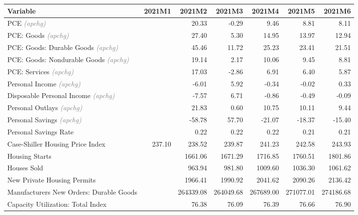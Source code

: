 \documentclass[11pt, letterpaper]{article}\usepackage[]{graphicx}\usepackage[]{color}
\begin{document}
\begin{table}[H]
\centering
\begingroup\fontsize{10pt}{12pt}\selectfont
\begin{tabular}{lrrrrrr}
  \hline
Variable & 2021M1 & 2021M2 & 2021M3 & 2021M4 & 2021M5 & 2021M6 \\ 
  \hline
PCE \textit{\footnotesize\textcolor{gray}{(apchg)}} &  & 20.33 & -0.29 & 9.46 & 8.81 & 8.11 \\ 
  PCE: Goods \textit{\footnotesize\textcolor{gray}{(apchg)}} &  & 27.40 & 5.30 & 14.95 & 13.97 & 12.94 \\ 
  PCE: Goods: Durable Goods \textit{\footnotesize\textcolor{gray}{(apchg)}} &  & 45.46 & 11.72 & 25.23 & 23.41 & 21.51 \\ 
  PCE: Goods: Nondurable Goods \textit{\footnotesize\textcolor{gray}{(apchg)}} &  & 19.14 & 2.17 & 10.06 & 9.45 & 8.81 \\ 
  PCE: Services \textit{\footnotesize\textcolor{gray}{(apchg)}} &  & 17.03 & -2.86 & 6.91 & 6.40 & 5.87 \\ 
  Personal Income \textit{\footnotesize\textcolor{gray}{(apchg)}} &  & -6.01 & 5.92 & -0.34 & -0.02 & 0.33 \\ 
  Disposable Personal Income \textit{\footnotesize\textcolor{gray}{(apchg)}} &  & -7.57 & 6.71 & -0.86 & -0.49 & -0.09 \\ 
  Personal Outlays \textit{\footnotesize\textcolor{gray}{(apchg)}} &  & 21.83 & 0.60 & 10.75 & 10.11 & 9.44 \\ 
  Personal Savings \textit{\footnotesize\textcolor{gray}{(apchg)}} &  & -58.78 & 57.70 & -21.07 & -18.37 & -15.40 \\ 
  Personal Savings Rate &  & 0.22 & 0.22 & 0.22 & 0.21 & 0.21 \\ 
  Case-Shiller Housing Price Index & 237.10 & 238.52 & 239.87 & 241.23 & 242.58 & 243.93 \\ 
  Housing Starts &  & 1661.06 & 1671.29 & 1716.85 & 1760.51 & 1801.86 \\ 
  Houses Sold &  & 963.94 & 981.80 & 1009.60 & 1036.30 & 1061.62 \\ 
  New Private Housing Permits &  & 1966.41 & 1990.92 & 2041.62 & 2090.26 & 2136.42 \\ 
  Manufacturers New Orders: Durable Goods &  & 264339.08 & 264049.68 & 267689.00 & 271077.01 & 274186.68 \\ 
  Capacity Utilization: Total Index &  & 76.38 & 76.09 & 76.39 & 76.66 & 76.90 \\ 

\end{tabular}
\end{table}
\end{document}
